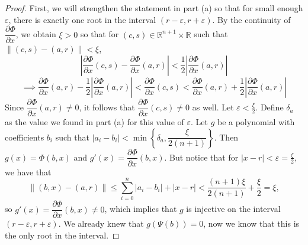 \documentclass{article}
\theoremstyle{plain} %
\numberwithin{thm}{section} %
\theoremstyle{definition}
\begin{document}
\begin{proof}
    First, we will strengthen the statement in part (a) so that for small enough \(\varepsilon\), there is exactly one root in the interval \((r - \varepsilon, r + \varepsilon)\). By the continuity of \(\dfrac{\partial \Phi}{\partial x}\), we obtain \(\xi > 0\) so that for \((c,s) \in \mathbb{R}^{n+1} \times \mathbb{R}\) such that \(\|(c,s) - (a,r)\| < \xi\),
    \[
        \left\vert \dfrac{\partial \Phi}{\partial x}(c,s) - \dfrac{\partial \Phi}{\partial x}(a,r) \right\vert < \frac{1}{2} \left\vert \dfrac{\partial \Phi}{\partial x}(a,r) \right\vert
    \]
    \[
        \implies \dfrac{\partial \Phi}{\partial x}(a,r) - \frac{1}{2}\left\vert \dfrac{\partial \Phi}{\partial x}(a,r) \right\vert < \dfrac{\partial \Phi}{\partial x}(c,s) < \dfrac{\partial \Phi}{\partial x}(a,r) + \frac{1}{2} \left\vert \dfrac{\partial \Phi}{\partial x}(a,r) \right\vert
    \]
    Since \(\dfrac{\partial \Phi}{\partial x}(a,r) \neq 0\), it follows that \(\dfrac{\partial \Phi}{\partial x}(c,s) \neq 0\) as well. Let \(\varepsilon < \frac{\xi}{2}\). Define \(\delta _a\) as the value we found in part (a) for this value of \(\varepsilon\). Let \(g\) be a polynomial with coefficients \(b_i\) such that \(|a_i - b_i| < \min \left\{\delta_a, \dfrac{\xi}{2(n+1)}\right\}\). Then \(g(x) = \Phi (b, x)\) and \(g'(x) = \dfrac{\partial \Phi}{\partial x}(b,x)\). But notice that for \(|x - r| < \varepsilon = \frac{\xi}{2}\), we have that
    \[
        \|(b,x) - (a,r)\| \leq \sum_{i=0}^{n} |a_i - b_i| + |x - r| < \frac{(n+1)\xi}{2(n+1)} + \frac{\xi}{2} = \xi,
    \]
    so \(g'(x) = \dfrac{\partial \Phi}{\partial x}(b,x) \neq 0\), which implies that \(g\) is injective on the interval \((r - \varepsilon, r + \varepsilon)\). We already knew that \(g(\Psi (b)) = 0\), now we know that this is the only root in the interval.


\end{proof}
\end{document}
